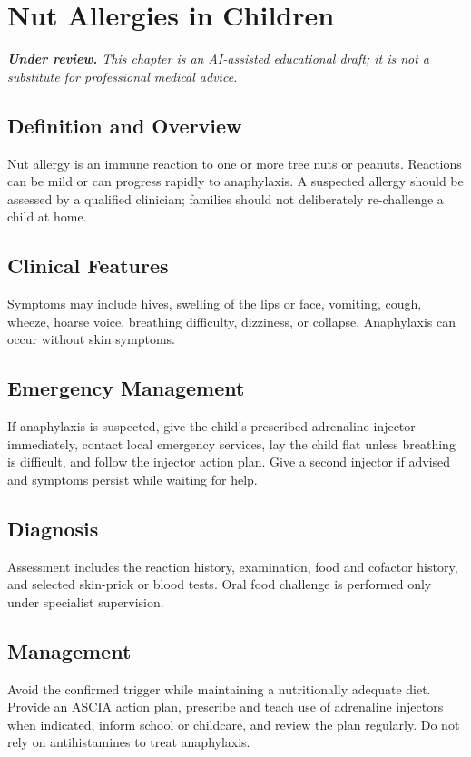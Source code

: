 \chapter{Nut Allergies in Children}

\medskip
\noindent\textit{\textbf{Under review.} This chapter is an AI-assisted educational draft; it is not a substitute for professional medical advice.}

\section*{Definition and Overview}
Nut allergy is an immune reaction to one or more tree nuts or peanuts. Reactions can be mild or can progress rapidly to anaphylaxis. A suspected allergy should be assessed by a qualified clinician; families should not deliberately re-challenge a child at home.

\section*{Clinical Features}
Symptoms may include hives, swelling of the lips or face, vomiting, cough, wheeze, hoarse voice, breathing difficulty, dizziness, or collapse. Anaphylaxis can occur without skin symptoms.

\section*{Emergency Management}
If anaphylaxis is suspected, give the child's prescribed adrenaline injector immediately, contact local emergency services, lay the child flat unless breathing is difficult, and follow the injector action plan. Give a second injector if advised and symptoms persist while waiting for help.

\section*{Diagnosis}
Assessment includes the reaction history, examination, food and cofactor history, and selected skin-prick or blood tests. Oral food challenge is performed only under specialist supervision.

\section*{Management}
Avoid the confirmed trigger while maintaining a nutritionally adequate diet. Provide an ASCIA action plan, prescribe and teach use of adrenaline injectors when indicated, inform school or childcare, and review the plan regularly. Do not rely on antihistamines to treat anaphylaxis.

